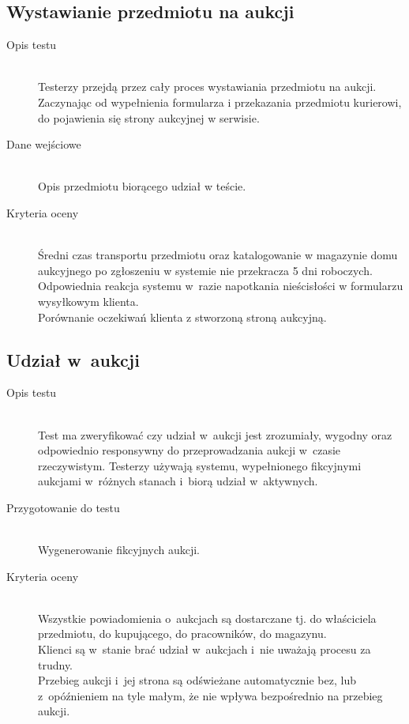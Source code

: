 \documentclass[10pt,a4paper]{article}
\begin{document}
\subsection{Wystawianie przedmiotu na aukcji}
\begin{description}
  \item[Opis testu] \hfill \\
    Testerzy przejdą przez cały proces wystawiania przedmiotu na aukcji.
    Zaczynając od wypełnienia formularza i przekazania przedmiotu kurierowi,
    do pojawienia się strony aukcyjnej w serwisie.
  \item[Dane wejściowe] \hfill \\
    Opis przedmiotu biorącego udział w teście.
  \item[Kryteria oceny] \hfill \\
    Średni czas transportu przedmiotu oraz katalogowanie w magazynie domu
    aukcyjnego po zgłoszeniu w systemie nie przekracza 5 dni roboczych.\\
    Odpowiednia reakcja systemu w~razie napotkania nieścisłości w formularzu
    wysyłkowym klienta.\\
    Porównanie oczekiwań klienta z stworzoną stroną aukcyjną.
\end{description}

\subsection{Udział w~aukcji}
\begin{description}
  \item[Opis testu] \hfill \\
    Test ma zweryfikować czy udział w~aukcji jest zrozumiały, wygodny oraz
    odpowiednio responsywny do przeprowadzania aukcji w~czasie rzeczywistym.
    Testerzy używają systemu, wypełnionego fikcyjnymi aukcjami w~różnych
    stanach i~biorą udział w~aktywnych.
  \item[Przygotowanie do testu] \hfill \\
    Wygenerowanie fikcyjnych aukcji.
  \item[Kryteria oceny] \hfill \\
    Wszystkie powiadomienia o~aukcjach są dostarczane tj. do właściciela
    przedmiotu, do kupującego, do pracowników, do magazynu.\\
    Klienci są w~stanie brać udział w~aukcjach i~nie uważają procesu za
    trudny.\\
    Przebieg aukcji i~jej strona są odświeżane automatycznie bez, lub
    z~opóźnieniem na tyle małym, że nie wpływa bezpośrednio na przebieg aukcji.
\end{description}
\end{document}
